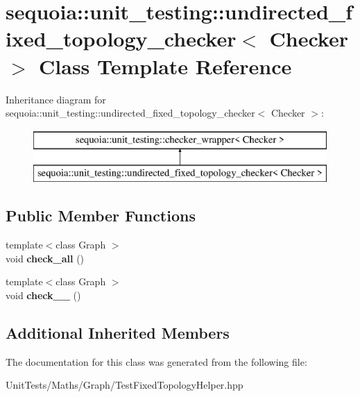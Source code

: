 \hypertarget{classsequoia_1_1unit__testing_1_1undirected__fixed__topology__checker}{}\section{sequoia\+::unit\+\_\+testing\+::undirected\+\_\+fixed\+\_\+topology\+\_\+checker$<$ Checker $>$ Class Template Reference}
\label{classsequoia_1_1unit__testing_1_1undirected__fixed__topology__checker}
Inheritance diagram for sequoia\+::unit\+\_\+testing\+::undirected\+\_\+fixed\+\_\+topology\+\_\+checker$<$ Checker $>$\+:\begin{figure}[H]
\begin{center}
\leavevmode
\includegraphics[height=2.000000cm]{classsequoia_1_1unit__testing_1_1undirected__fixed__topology__checker}
\end{center}
\end{figure}
\subsection*{Public Member Functions}
\begin{DoxyCompactItemize}
\item 
\mbox{\label{classsequoia_1_1unit__testing_1_1undirected__fixed__topology__checker_a294b53b4cc10c93b0fd8a7c292854818}} 
{\footnotesize template$<$class Graph $>$ }\\void {\bfseries check\+\_\+all} ()
\item 
\mbox{\label{classsequoia_1_1unit__testing_1_1undirected__fixed__topology__checker_a303a21ba707cb9f455d73f4b28394b99}} 
{\footnotesize template$<$class Graph $>$ }\\void {\bfseries check\+\_\+\_} ()
\end{DoxyCompactItemize}
\subsection*{Additional Inherited Members}


The documentation for this class was generated from the following file\+:\begin{DoxyCompactItemize}
\item 
Unit\+Tests/\+Maths/\+Graph/Test\+Fixed\+Topology\+Helper.\+hpp\end{DoxyCompactItemize}
